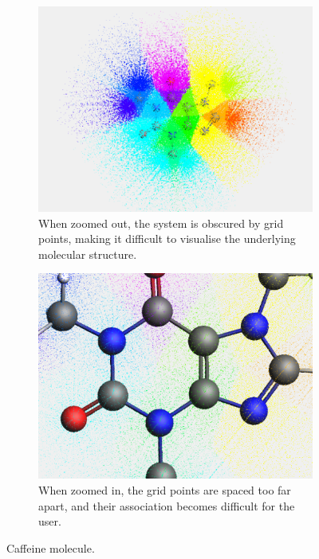 \begin{figure}[h]
  \centering
  \begin{subfigure}{0.48\textwidth}
    \centering
    \includegraphics[width=\linewidth]{gui_ss/zoomOut2.png}
    \caption{When zoomed out, the system is obscured by grid points,
      making it difficult to visualise the underlying molecular structure.}
    \label{gui_anterior}
  \end{subfigure}\hfill
  \begin{subfigure}{0.48\textwidth}
    \centering
    \includegraphics[width=\linewidth]{gui_ss/zoomIn2.png}
    \caption{When zoomed in, the grid points are spaced too far apart,
      and their association becomes difficult for the user.}
    \label{gui_atomic_basin}
  \end{subfigure}
  \caption{Caffeine molecule.}
  \label{water_molecule_gui}
\end{figure}

